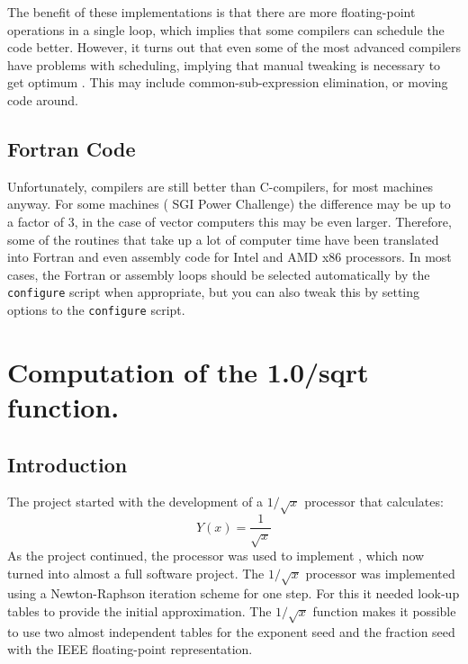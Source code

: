 The benefit of these implementations is that there are more floating-point
operations in a single loop, which implies that some compilers
can schedule the code better. However, it turns out that even
some of the most advanced compilers have problems with scheduling, 
implying that manual tweaking is necessary to get optimum 
.
This may include common-sub-expression elimination, or moving
code around. 

\subsection{Fortran Code}
Unfortunately,  compilers are still better than
C-compilers, for most machines anyway. For some machines ({\eg} SGI
Power Challenge) the difference may be up to a factor of 3, in the
case of vector computers this may be even larger. Therefore, some of
the routines that take up a lot of computer time have been translated
into Fortran and even assembly code for Intel and AMD x86 processors.
In most cases, the Fortran or assembly loops should be selected 
automatically by the {\tt configure} script when appropriate, but you can
also tweak this by setting options to the {\tt configure} script.

\section{Computation of the 1.0/sqrt function.}
\label{sec:sqrt}
\subsection{Introduction}
The {\gromacs} project started with the development of a $1/\sqrt{x}$
processor that calculates:
\begin{equation}
Y(x) = \frac{1}{ \sqrt{x} }
\end{equation}
As the project continued, the {\intel} processor was used to implement
{\gromacs}, which now turned into almost a full software project.  The
$1/\sqrt{x}$ processor was implemented using a Newton-Raphson
iteration scheme for one step. For this it needed look-up tables to
provide the initial approximation. The $1/\sqrt{x}$ function makes it
possible to use two almost independent tables for the exponent seed
and the fraction seed with the IEEE floating-point representation.


